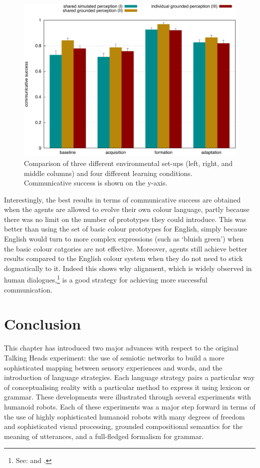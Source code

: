 \begin{figure}[htbp]
  \centerline{\includegraphics[width=.9\textwidth]{chap11/figs/grounding-comparison.pdf}}
\caption{Comparison of three different environmental set-ups (left, right, and middle columns)
and four different learning conditions. Communicative success is shown on the y-axis.}
\label{fig:grounding-comparison} 
\end{figure}

Interestingly, the best results in terms of communicative success
are obtained when the agents are allowed to evolve their own colour language, 
partly because there was no limit on the number of prototypes they could introduce. This was better 
than using the set of basic colour prototypes for English, simply because English would turn to more complex expressions
(such as `bluish green') when the basic colour catgories are not effective. Moreover, 
agents still achieve better results compared to the English colour system when they do not need to stick 
dogmatically to it. Indeed this shows why alignment, which is widely observed
in human dialogues,\footnote{See: \cite{Garrod:1987} and \cite{Galantucci:2005}.}
is a good strategy for achieving more successful communication.

\section{Conclusion}

This chapter has introduced two major advances with respect to the original Talking Heads experiment: 
the use of semiotic networks to build a more sophisticated mapping between sensory experiences and words, and the 
introduction of language strategies. Each language strategy pairs a particular way of conceptualising reality 
with a particular method to express it using lexicon or grammar. 
These developments were illustrated through several experiments with humanoid robots. Each of these experiments 
was a major step forward in terms of the use of 
highly sophisticated humanoid robots with many degrees of freedom and sophisticated visual processing, grounded compositional 
semantics for the meaning of utterances, and a full-fledged formalism for grammar. 


